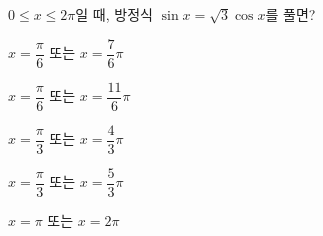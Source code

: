 $0\le x\le 2\pi$일 때, 방정식 $\sin x=\sqrt{3}\cos x$를 풀면? 
\begin{choicesii}{\rule[-3ex]{0pt}{8ex}$x=\dfrac{\pi}{6}$ 또는 $x=\dfrac{7}{6}\pi$}{\rule[-3ex]{0pt}{8ex}$x=\dfrac{\pi}{6}$ 또는 $x=\dfrac{11}{6}\pi$}{\rule[-3ex]{0pt}{8ex}$x=\dfrac{\pi}{3}$ 또는 $x=\dfrac{4}{3}\pi$}{\rule[-3ex]{0pt}{8ex}$x=\dfrac{\pi}{3}$ 또는 $x=\dfrac{5}{3}\pi$}{\rule[-3ex]{0pt}{8ex}$x=\pi$ 또는 $x=2\pi$}\end{choicesii}

